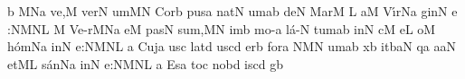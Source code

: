 \Internote
\nosolesmescustos
\initiumgregorianum
\znotes\fissum{1pt}\bmolle b\en
%
\sgn {}{-}{}\punctum M\nonspatium\pes Na\egn
\sgn ve,\punctum M\egn
\spatium
\begingroup
\bgenerale
\sgn ver\punctum N\egn
\sgn {}um\punctum M\augmentum N\egn
\spatium\asteriscus\spatium
\sgn C{o}r\punctum b\egn
\sgn pus\punctum a\egn
\spatium
\sgn n{a}t\punctum N\egn
\sgn {}um\punctum a\augmentum b\egn
\spatium
\divisiominor
\spatium
\sgn de{}\punctum N\egn
\spatium
\sgn Mar\punctum M\egn
\sgn {}{\'\i}{-}\punctum L\egn
\sgn {}a{}\punctum M\egn
\spatium
\sgn V{\'\i}r\pes Na\egn
\sgn gin\punctum N\egn
\sgn {}e{ :}\clivis NM\augmentumduplex NL\egn
\spatium
\divisiofinalis
\spatium
\custos M
\lineaproxima
\sgn Ve{-r}\Salicus MNa\egn
\sgn {}e{}\punctum M\egn
\spatium
\sgn p{a}{s}\punctum N\egn
\sgn su{m,}\punctum M\augmentum N\egn
\spatium
\sgn {}im\punctum b\egn
\sgn mo{-}\punctum a\egn
\sgn l{\'a}{-}\punctum N\egn
\sgn tum\punctum a\augmentum b\egn
\spatium
\divisiominor
\spatium
\sgn {}in\punctum N\egn
\spatium
{}c\punctum M\egn
\sgn {}e{}\punctum L\egn
\spatium
{}o{}\punctum M\egn
\spatium
\sgn h{\'o}m\pes Na\egn
\sgn {}in\punctum N\egn
\sgn {}e:\clivis NM\augmentumduplex NL\egn
\spatium
\divisiofinalis
\spatium
\custos a
\lineaproxima
\sgn C{u}j\punctum a\egn
\sgn {}us\punctum c\egn
\spatium
\sgn l{a}{t}\punctum d\egn
\sgn {}us\punctum c\augmentum d\egn
\spatium
{}er\punctum b\egn
\sgn for\punctum a\egn
{}\porrectus NMN\egn
\sgn {}um\punctum a\augmentum b\egn
\spatium
\divisiominor
\spatium
x\punctum b\egn
\sgn {}it\climacus baN\egn
\spatium
{}q\punctum a\egn
{}a{}\clivis aN\egn
\spatium
\sgn {}et\clivis ML\egn
\spatium
\sgn s{\'a}n\pes Na\egn
{}in\punctum N\egn
\sgn {}e:\clivis NM\augmentumduplex NL\egn
\spatium
\divisiofinalis
\spatium
\custos a
\lineaproxima
\sgn {}E{s}\punctum a\egn
\sgn to{}\punctum c\egn
\spatium
\sgn n{o}b\punctum d\egn
\sgn {}is\punctum c\augmentum d\egn
\spatium
{}g\punctum b\egn

